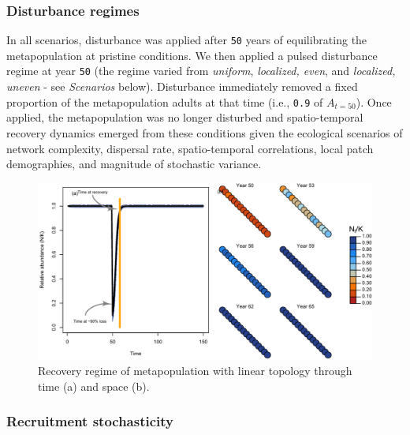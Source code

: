 \documentclass[
]{article}
\begin{document}
\hypertarget{disturbance-regimes}{%
\subsubsection{Disturbance regimes}\label{disturbance-regimes}}

In all scenarios, disturbance was applied after \texttt{50} years of
equilibrating the metapopulation at pristine conditions. We then applied
a pulsed disturbance regime at year \texttt{50} (the regime varied from
\emph{uniform}, \emph{localized, even}, and \emph{localized, uneven} -
see \emph{Scenarios} below). Disturbance immediately removed a fixed
proportion of the metapopulation adults at that time (i.e., \texttt{0.9}
of \(A_{t=50}\)). Once applied, the metapopulation was no longer
disturbed and spatio-temporal recovery dynamics emerged from these
conditions given the ecological scenarios of network complexity,
dispersal rate, spatio-temporal correlations, local patch demographies,
and magnitude of stochastic variance.

\begin{figure}[H]

{\centering \includegraphics{Managing_for_ecological_surprises_in_metapopulations_files/figure-latex/example disturbance regime-1} 

}

\caption{Recovery regime of metapopulation with linear topology through time (a) and space (b).}\label{fig:example disturbance regime}
\end{figure}

\hypertarget{recruitment-stochasticity}{%
\subsubsection{Recruitment
stochasticity}\label{recruitment-stochasticity}}
\end{document}
